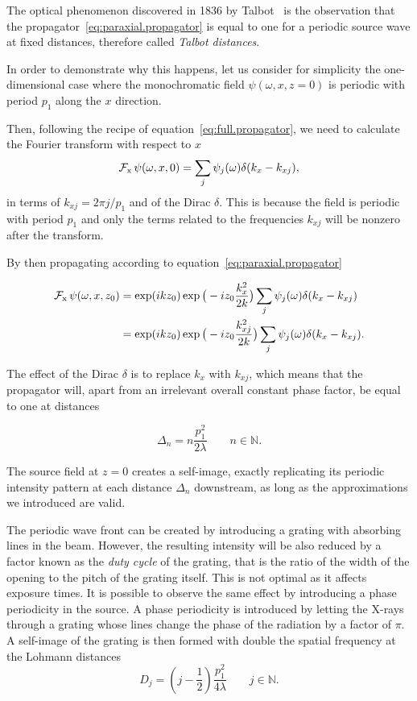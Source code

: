 The optical phenomenon discovered in 1836 by Talbot~\parencite{Talbot1836} is the observation that
the propagator~\eqref{eq:paraxial.propagator} is equal to one for a periodic
source wave at fixed distances, therefore called \emph{Talbot distances}.

In order to demonstrate why this happens, let us consider for simplicity the one-dimensional case where the
monochromatic field $\psi(\omega, x, z=0)$ is periodic with period $p_1$
along the $x$ direction. 

Then, following the recipe of equation~\eqref{eq:full.propagator}, we need
to calculate the Fourier transform with respect to $x$
\begin{equation*}
    \operatorname{\mathcal{F}_{x}}\psi(\omega, x, 0) = \sum_j \psi_j(\omega)\delta(k_x -
    k_{xj}),
\end{equation*}
in terms of $k_{xj} = 2\pi j/ p_1$ and of the Dirac $\delta$. This is
because the field is periodic with period $p_1$ and only the terms related
to the frequencies $k_{xj}$ will be nonzero after the transform.

By then propagating according to equation~\eqref{eq:paraxial.propagator}

\begin{align}
    \operatorname{\mathcal{F}_{x}}\psi(\omega, x, z_0) &= \exp(ikz_0)\exp\big(-i
    z_0\frac{k_x^2}{2k}\big)\sum_j \psi_j(\omega)\delta(k_x -
    k_{xj}) \\
    &= \exp(ikz_0)\exp\big(-i z_0\frac{k_{xj}^2}{2k}\big)\sum_j \psi_j(\omega)\delta(k_x -
    k_{xj}).
    \label{eq:talbot1}
\end{align}

The effect of the Dirac $\delta$ is to replace $k_x$ with $k_{xj}$, which
means that the propagator will, apart from an irrelevant overall constant phase
factor, be equal to one at distances

\begin{equation}
    \Delta_n = n \frac{p_1^2}{2 \lambda} \qquad n \in
    \mathbb{N}.\label{eq:talbot.distance}
\end{equation}

The source field at $z = 0$ creates a
self-image, exactly replicating its periodic intensity pattern at each
distance $\Delta_n$ downstream, as long as the approximations we introduced
are valid.

The periodic wave front can be created by introducing a grating with absorbing lines in
the beam. However, the resulting intensity will be also reduced by a factor
known as the \emph{duty cycle} of the grating, that is the ratio of the
width of the opening to the pitch of the grating itself. This is not optimal
as it affects exposure times. It is possible to observe the same effect
by introducing a phase periodicity in the source. A phase periodicity is
introduced by letting the X-rays
through a grating whose lines change the phase of the radiation by a
factor of $\pi$. A self-image of the grating is then formed with double the
spatial frequency at the Lohmann distances~\parencite{Lohmann1971}
\begin{equation}
    D_j = \left(j - \frac{1}{2}\right) \frac{p_1^2}{4 \lambda} \qquad
    j\in\mathbb{N}.\label{eq:lohmann-distance}
\end{equation}

